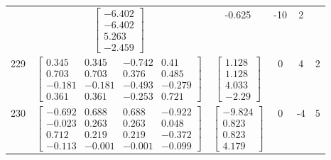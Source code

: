 \documentclass[a4paper,12pt]{article}
\begin{document}
\begin{tabular}{c c c c c c}
&
$\begin{bmatrix} -6.402 \\ -6.402 \\ 5.263 \\ -2.459 \end{bmatrix}$
&
-0.625
&
-10
&
2
\\
229
&
$\begin{bmatrix} 0.345 & 0.345 & -0.742 & 0.41 \\ 0.703 & 0.703 & 0.376 & 0.485 \\ -0.181 & -0.181 & -0.493 & -0.279 \\ 0.361 & 0.361 & -0.253 & 0.721 \end{bmatrix}$
&
$\begin{bmatrix} 1.128 \\ 1.128 \\ 4.033 \\ -2.29 \end{bmatrix}$
&
0
&
4
&
2
\\
230
&
$\begin{bmatrix} -0.692 & 0.688 & 0.688 & -0.922 \\ -0.023 & 0.263 & 0.263 & 0.048 \\ 0.712 & 0.219 & 0.219 & -0.372 \\ -0.113 & -0.001 & -0.001 & -0.099 \end{bmatrix}$
&
$\begin{bmatrix} -9.824 \\ 0.823 \\ 0.823 \\ 4.179 \end{bmatrix}$
&
0
&
-4
&
5
\\
\end{tabular} \egroup \newpage
\end{document}
